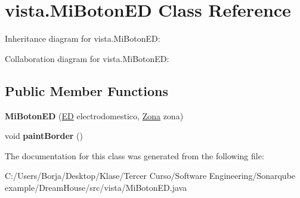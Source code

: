 \hypertarget{classvista_1_1_mi_boton_e_d}{}\section{vista.\+Mi\+Boton\+ED Class Reference}
\label{classvista_1_1_mi_boton_e_d}


Inheritance diagram for vista.\+Mi\+Boton\+ED\+:


Collaboration diagram for vista.\+Mi\+Boton\+ED\+:
\subsection*{Public Member Functions}
\begin{DoxyCompactItemize}
\item 
\mbox{\label{classvista_1_1_mi_boton_e_d_a6bf8b2b884c0f583021de69e0a7eea73}} 
{\bfseries Mi\+Boton\+ED} (\mbox{\hyperlink{classmodelo_1_1_e_d}{ED}} electrodomestico, \mbox{\hyperlink{classmodelo_1_1_zona}{Zona}} zona)
\item 
\mbox{\label{classvista_1_1_mi_boton_e_d_a84868d3ea73732ef8fa4385a73e3b3b9}} 
void {\bfseries paint\+Border} ()
\end{DoxyCompactItemize}


The documentation for this class was generated from the following file\+:\begin{DoxyCompactItemize}
\item 
C\+:/\+Users/\+Borja/\+Desktop/\+Klase/\+Tercer Curso/\+Software Engineering/\+Sonarqube example/\+Dream\+House/src/vista/Mi\+Boton\+E\+D.\+java\end{DoxyCompactItemize}

